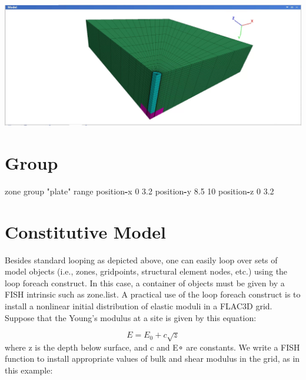 \documentclass[a4paper, nobind]{templates/ociamthesis}
\newenvironment{Shaded}{\begin{snugshade}}{\end{snugshade}}
\newcommand{\BuiltInTok}[1]{#1}
\newcommand{\DecValTok}[1]{\textcolor[rgb]{0.00,0.00,0.81}{#1}}
\newcommand{\FloatTok}[1]{\textcolor[rgb]{0.00,0.00,0.81}{#1}}
\newcommand{\NormalTok}[1]{#1}
\newcommand{\OperatorTok}[1]{\textcolor[rgb]{0.81,0.36,0.00}{\textbf{#1}}}
\newcommand{\StringTok}[1]{\textcolor[rgb]{0.31,0.60,0.02}{#1}}
\renewenvironment{Shaded}
{
  \vspace{10pt}%
  \begin{snugshade}%
}{%
  \end{snugshade}%
  \vspace{8pt}%
}
\begin{document}
\includegraphics[width=1\linewidth]{myfigureeeeee/abc}

\hypertarget{group}{%
\section{Group}\label{group}}

\begin{Shaded}
\begin{Highlighting}[]
\NormalTok{zone group }\StringTok{"plate"} \BuiltInTok{range}\NormalTok{ position}\OperatorTok{{-}}\NormalTok{x }\DecValTok{0} \FloatTok{3.2}\NormalTok{ position}\OperatorTok{{-}}\NormalTok{y }\FloatTok{8.5} \DecValTok{10}\NormalTok{ position}\OperatorTok{{-}}\NormalTok{z }\DecValTok{0} \FloatTok{3.2}
\end{Highlighting}
\end{Shaded}

\hypertarget{constitutive-model}{%
\section{Constitutive Model}\label{constitutive-model}}

Besides standard looping as depicted above, one can easily loop over sets of model objects (i.e., zones, gridpoints, structural element nodes, etc.) using the loop foreach construct. In this case, a container of objects must be given by a FISH intrinsic such as zone.list. A practical use of the loop foreach construct is to install a nonlinear initial distribution of elastic moduli in a FLAC3D grid. Suppose that the Young's modulus at a site is given by this equation:

\[ E = E_0 + c \sqrt{z}  \]
where z is the depth below surface, and c and E∘ are constants. We write a FISH function to install appropriate values of bulk and shear modulus in the grid, as in this example:
\end{document}
